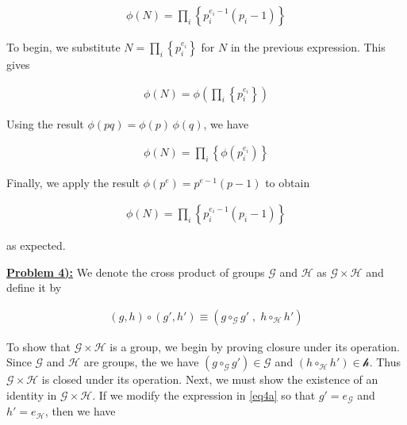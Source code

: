 \documentclass{article}[12]
\numberwithin{equation}{section}
\newcommand{\numbpr}[1]{\setcounter{section}{#1} \setcounter{equation}{0}}
\newcommand{\prob}[1]{\textbf{\underline{Problem #1):}}}
\begin{document}
\begin{flushleft}
\begin{align*}
  \phi \left( N \right) = \prod_i \left\{ p_i^{e_i - 1} \left( p_i - 1 \right) \right\}
\end{align*}

To begin, we substitute $N = \prod_i \left\{ p_i^{e_i} \right\}$ for $N$ in the previous expression.  This gives

\begin{align*}
  \phi \left( N \right) = \phi \left( \prod_i \left\{ p_i^{e_i} \right\} \right)
\end{align*}

Using the result $\phi \left( p q \right) = \phi \left( p \right) \, \phi \left( q \right)$, we have

\begin{align*}
  \phi \left( N \right) = \prod_i \left\{ \phi \left( p_i^{e_i} \right) \right\}
\end{align*}

Finally, we apply the result $\phi \left( p^e \right) = p^{e-1} \left( p - 1 \right)$ to obtain 

\begin{align*}
  \phi \left( N \right) = \prod_i \left\{ p_i^{e_i - 1} \left( p_i - 1 \right) \right\}
\end{align*}

as expected.




\vspace{0.35in}



\numbpr{4}
\prob{4} We denote the cross product of groups $\mathcal{G}$ and $\mathcal{H}$ as $\mathcal{G} \times \mathcal{H}$ and define it by 

\begin{align}
  \left( g, h \right) \circ \left( g', h' \right) \equiv \left( g \circ_\mathcal{G} g' \; , \; h \circ_\mathcal{H} h' \right) \label{eq4a}
\end{align}

To show that $\mathcal{G} \times \mathcal{H}$ is a group, we begin by proving closure under its operation.  Since $\mathcal{G}$ and $\mathcal{H}$ are groups, the we have $\left( g \circ_\mathcal{G} g' \right) \in \mathcal{G}$ and $\left( h \circ_\mathcal{H} h' \right) \in \mathcal{h}$.  Thus $\mathcal{G} \times \mathcal{H}$ is closed under its operation.  Next, we must show the existence of an identity in $\mathcal{G} \times \mathcal{H}$.  If we modify the expression in \ref{eq4a} so that $g' = e_\mathcal{G}$ and $h' = e_\mathcal{H}$, then we have 


\end{flushleft}
\end{document}
